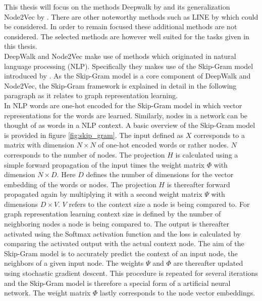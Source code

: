 	\noindent This thesis will focus on the methods Deepwalk by
	\cite{perozzi2014deepwalk} and its generalization Node2Vec by
	\cite{grover2016node2vec}. There are other noteworthy methods such as LINE
	by \cite{tang2015line} which could be considered. In order to remain
	focused these additional methods are not considered. The selected methods
	are however well suited for the tasks given in this thesis. \\

	\noindent DeepWalk and Node2Vec make use of methods which originated in 
	natural language processing (NLP). Specifically they makes use of the 
	Skip-Gram model introduced by
	\cite{mikolov2013efficient,mikolov2013distributed}. As the Skip-Gram model
	is a core component of DeepWalk and Node2Vec, the Skip-Gram framework is
	explained in detail in the following paragraph as it relates to graph
	representation learning. \\

	\noindent In NLP words are one-hot encoded for the Skip-Gram model in which 
	vector representations for the words are learned. Similarly, nodes in a network 
	can be thought of as words in a NLP context. A basic overview of the Skip-Gram 
	model is provided in figure \ref{fig:skip_gram}. The input defined as $X$ corresponds to 
	a matrix with dimension $N \times N$ of one-hot encoded words or rather nodes. 
	$N$ corresponds to the number of nodes. The projection $H$ is calculated using 
	a simple forward propagation of the input times the weight matrix $\Phi$ with 
	dimension $N \times D$. Here $D$ defines the number of dimensions for the 
	vector embedding of the words or nodes. The projection $H$ is thereafter 
	forward propagated again by multiplying it with a second weight matrix $\Psi$ 
	with dimensions $D \times V$. $V$ refers to the context size a node is being 
	compared to. For graph representation learning context size is defined by the 
	number of neighboring nodes a node is being compared to. The output is thereafter 
	activated using the Softmax activation function and the loss is calculated
	by comparing the activated output with the actual context node. The
	aim of the Skip-Gram model is to accurately predict the context of an input
	node, the neighbors of a given input node. The weights $\Psi$ and 
	$\Phi$ are thereafter updated using stochastic gradient descent. This procedure is 
	repeated for several iterations and the Skip-Gram model is therefore a 
	special form of a artificial neural network. The weight matrix $\Phi$ lastly 
	corresponds to the node vector embeddings. \\ 

